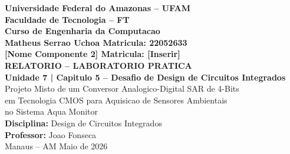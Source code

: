 \documentclass[12pt, a4paper]{article}
\begin{document}
\begin{titlepage}
  \begin{center}
    {\Large\bfseries Universidade Federal do Amazonas -- UFAM}\\[0.3cm]
    {\large\bfseries Faculdade de Tecnologia -- FT}\\[0.1cm]
    {\large\bfseries Curso de Engenharia da Computacao}\\[3cm]
    {\large\bfseries Matheus Serrao Uchoa \quad Matricula: 22052633}\\[0.4cm]
    {\large\bfseries [Nome Componente 2] \quad Matricula: [Inserir]}\\[3cm]
    {\LARGE\bfseries RELATORIO -- LABORATORIO PRATICA\\[0.3cm]
    Unidade 7 | Capitulo 5 -- Desafio de Design de Circuitos Integrados}\\[0.8cm]
    {\Large Projeto Misto de um Conversor Analogico-Digital SAR de 4-Bits\\
    em Tecnologia CMOS para Aquisicao de Sensores Ambientais\\
    no Sistema Aqua Monitor}\\[3cm]
    \vfill
    {\normalsize\textbf{Disciplina:} Design de Circuitos Integrados}\\[0.1cm]
    {\normalsize\textbf{Professor:} Joao Fonseca}\\[0.3cm]
    {\normalsize Manaus -- AM \quad Maio de 2026}
  \end{center}
\end{titlepage}

\setcounter{page}{1}
\tableofcontents
\newpage

\begin{abstract}
\noindent
Este trabalho documenta o projeto completo, desde a especificacao eletrica ate a simulacao
pos-layout, de um Conversor Analogico-Digital de Aproximacoes Sucessivas (SAR ADC) de 4-bits em
tecnologia CMOS de $1{,}8\,\text{V}$ (180\,nm), concebido como front-end de aquisicao dedicado aos
sensores analogicos do sistema \textit{Aqua Monitor}. A arquitetura Mixed-Signal articula tres
blocos: (i) rede de redistribuicao de carga com 16 capacitores unitarios de $C_0 = 100\,\text{fF}$,
(ii) comparador CMOS de malha aberta e (iii) FSM sintetizada em Verilog RTL. O fluxo de design
cobre 7 etapas: especificacao, RTL, simulacao digital (Icarus Verilog), simulacao analogica
pre-layout (Ngspice v46), layout fisico Common-Centroid (KLayout v0.30.8 + Python API),
extracao de parasitas via leitura do GDS e simulacao pos-layout. A extracao revelou uma
capacitancia parasita total de $6{,}72\,\text{fF}$ no no $V_{top}$ (0,42\% de $C_{tot}$).
O desvio maximo entre pre e pos-layout foi de $2{,}6\,\text{mV}$, inferior a $V_{LSB}/40$,
comprovando robustez do projeto para o eventual \textit{tape-out}.\\[0.5em]
\textbf{Palavras-chave:} SAR ADC, CMOS, Mixed-Signal, Redistribuicao de Carga, Common-Centroid,
Verilog, SPICE, KLayout, Extracao de Parasitas.
\end{abstract}
\newpage
\end{document}
